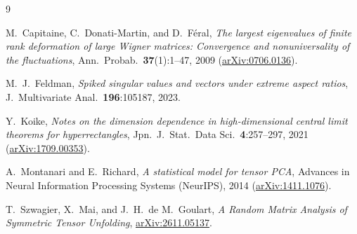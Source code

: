 \documentclass[11pt]{article}
\theoremstyle{plain}
\theoremstyle{definition}
\theoremstyle{remark}
\begin{document}
\begin{thebibliography}{9}

M.~Capitaine, C.~Donati-Martin, and D.~F\'eral,
\emph{The largest eigenvalues of finite rank deformation of large Wigner matrices: Convergence and nonuniversality of the fluctuations},
Ann.\ Probab.\ \textbf{37}(1):1--47, 2009 (\href{https://arxiv.org/abs/0706.0136}{arXiv:0706.0136}).

M.~J.~Feldman,
\emph{Spiked singular values and vectors under extreme aspect ratios},
J.\ Multivariate Anal.\ \textbf{196}:105187, 2023.

Y.~Koike,
\emph{Notes on the dimension dependence in high-dimensional central limit theorems for hyperrectangles},
Jpn.\ J.\ Stat.\ Data Sci.\ \textbf{4}:257--297, 2021 (\href{https://arxiv.org/abs/1709.00353}{arXiv:1709.00353}).

A.~Montanari and E.~Richard,
\emph{A statistical model for tensor PCA},
Advances in Neural Information Processing Systems (NeurIPS), 2014 (\href{https://arxiv.org/abs/1411.1076}{arXiv:1411.1076}).

T.~Szwagier, X.~Mai, and J.~H.~de M.~Goulart,
\emph{A Random Matrix Analysis of Symmetric Tensor Unfolding},
\href{https://arxiv.org/abs/2611.05137}{arXiv:2611.05137}.

\end{thebibliography}
\end{document}
